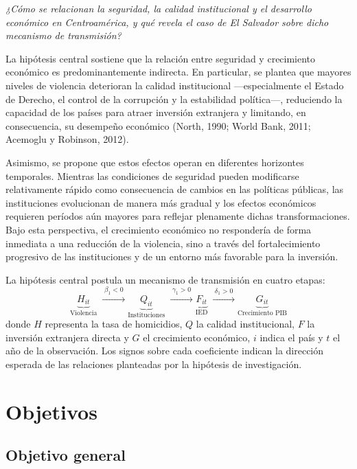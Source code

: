 \documentclass[11pt,a4paper]{article}
\begin{document}
\begin{center}
\textit{¿Cómo se relacionan la seguridad, la calidad institucional y el desarrollo económico en Centroamérica, y qué revela el caso de El Salvador sobre dicho mecanismo de transmisión?}
\end{center}

La hipótesis central sostiene que la relación entre seguridad y crecimiento económico es predominantemente indirecta. En particular, se plantea que mayores niveles de violencia deterioran la calidad institucional ---especialmente el Estado de Derecho, el control de la corrupción y la estabilidad política---, reduciendo la capacidad de los países para atraer inversión extranjera y limitando, en consecuencia, su desempeño económico (North, 1990; World Bank, 2011; Acemoglu y Robinson, 2012).

Asimismo, se propone que estos efectos operan en diferentes horizontes temporales. Mientras las condiciones de seguridad pueden modificarse relativamente rápido como consecuencia de cambios en las políticas públicas, las instituciones evolucionan de manera más gradual y los efectos económicos requieren períodos aún mayores para reflejar plenamente dichas transformaciones. Bajo esta perspectiva, el crecimiento económico no respondería de forma inmediata a una reducción de la violencia, sino a través del fortalecimiento progresivo de las instituciones y de un entorno más favorable para la inversión.

La hipótesis central postula un mecanismo de transmisión en cuatro etapas:
\[
\underbrace{H_{it}}_{\text{Violencia}}
\;\xrightarrow{\;\beta_1 < 0\;}
\underbrace{Q_{it}}_{\text{Instituciones}}
\;\xrightarrow{\;\gamma_1 > 0\;}
\underbrace{F_{it}}_{\text{IED}}
\;\xrightarrow{\;\delta_1 > 0\;}
\underbrace{G_{it}}_{\text{Crecimiento PIB}}
\]
donde $H$ representa la tasa de homicidios, $Q$ la calidad institucional, $F$ la inversión extranjera directa y $G$ el crecimiento económico, $i$ indica el país y $t$ el año de la observación. Los signos sobre cada coeficiente indican la dirección esperada de las relaciones planteadas por la hipótesis de investigación.


\section*{Objetivos}

\subsection*{Objetivo general}
\end{document}

